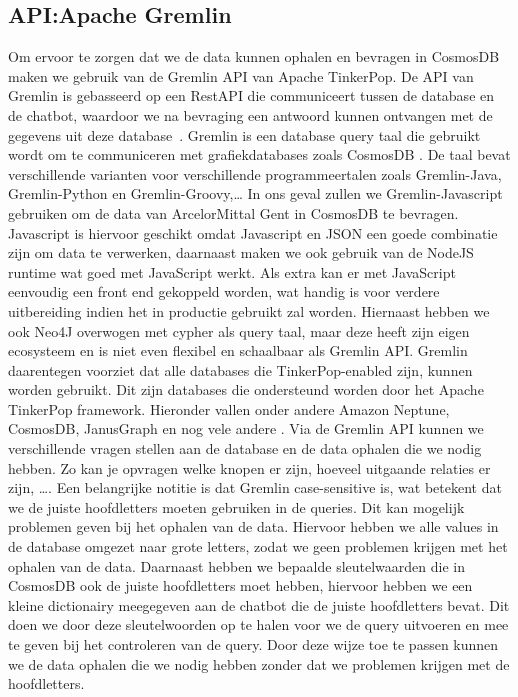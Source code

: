 \subsection{API:\@ Apache Gremlin}
Om ervoor te zorgen dat we de data kunnen ophalen en bevragen in CosmosDB maken we gebruik van de Gremlin API van Apache TinkerPop.
De API van Gremlin is gebasseerd op een RestAPI die communiceert tussen de database en de chatbot, waardoor we na bevraging een antwoord kunnen ontvangen met de gegevens uit deze database~\autocite{Medina2021}.
Gremlin is een database query taal die gebruikt wordt om te communiceren met grafiekdatabases zoals CosmosDB \autocite{Tinkerpop2023}.\@
De taal bevat verschillende varianten voor verschillende programmeertalen zoals Gremlin-Java, Gremlin-Python en Gremlin-Groovy,\dots
In ons geval zullen we Gremlin-Javascript gebruiken om de data van ArcelorMittal Gent in CosmosDB te bevragen. 
Javascript is hiervoor geschikt omdat Javascript en JSON een goede combinatie zijn om data te verwerken, daarnaast maken we ook gebruik van de NodeJS runtime wat goed met JavaScript werkt. 
Als extra kan er met JavaScript eenvoudig een front end gekoppeld worden, wat handig is voor verdere uitbereiding indien het in productie gebruikt zal worden.
Hiernaast hebben we ook Neo4J overwogen met cypher als query taal, maar deze heeft zijn eigen ecosysteem en is niet even flexibel en schaalbaar als Gremlin API.\@
Gremlin daarentegen voorziet dat alle databases die TinkerPop-enabled zijn, kunnen worden gebruikt. Dit zijn databases die ondersteund worden door het Apache TinkerPop framework.
Hieronder vallen onder andere Amazon Neptune, CosmosDB, JanusGraph en nog vele andere \autocite{Tinkerpop2023a}.
Via de Gremlin API kunnen we verschillende vragen stellen aan de database en de data ophalen die we nodig hebben. 
Zo kan je opvragen welke knopen er zijn, hoeveel uitgaande relaties er zijn, \dots.
Een belangrijke notitie is dat Gremlin case-sensitive is, wat betekent dat we de juiste hoofdletters moeten gebruiken in de queries.
Dit kan mogelijk problemen geven bij het ophalen van de data. Hiervoor hebben we alle values in de database omgezet naar grote letters, zodat we geen problemen krijgen met het ophalen van de data.
Daarnaast hebben we bepaalde sleutelwaarden die in CosmosDB ook de juiste hoofdletters moet hebben, hiervoor hebben we een kleine dictionairy meegegeven aan de chatbot die de juiste hoofdletters bevat.
Dit doen we door deze sleutelwoorden op te halen voor we de query uitvoeren en mee te geven bij het controleren van de query.
Door deze wijze toe te passen kunnen we de data ophalen die we nodig hebben zonder dat we problemen krijgen met de hoofdletters.
